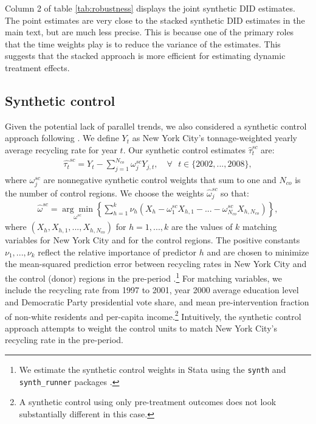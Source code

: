 \documentclass[12pt]{article}
\begin{document}
Column 2 of table \ref{tab:robustness} displays the joint synthetic DID estimates.  The point estimates are very close to the stacked synthetic DID estimates in the main text, but are much less precise.  This is because one of the primary roles that the time weights play is to reduce the variance of the estimates.  This suggests that the stacked approach is more efficient for estimating dynamic treatment effects.

\subsection{Synthetic control}

Given the potential lack of parallel trends, we also considered a synthetic control approach following \cite{abadie2021}.  We define \(Y_t\) as New York City's tonnage-weighted yearly average recycling rate for year \(t\).  Our synthetic control estimates \(\hat{\tau}_t^{sc}\) are:
\begin{align} \label{eq:sc}
    \hat{\tau_t}^{sc} = Y_t - \sum_{j=1}^{N_{co}} \omega^{sc}_j Y_{j,t}, \quad \forall \text{ } t \in \lbrace 2002,...,2008 \rbrace,
\end{align}
where \(\omega^{sc}_j\) are nonnegative synthetic control weights that sum to one and \(N_{co}\) is the number of control regions.  We choose the weights \(\hat{\omega}^{sc}_j\) so that:
\begin{align}
    \hat{\omega}^{sc} = \underset{\omega^{sc}}{\arg\min} \left\lbrace \sum_{h=1}^{k} \nu_h (X_h-\omega^{sc}_1 X_{h,1}-...-\omega^{sc}_{N_{co}} X_{h,N_{co}}) \right\rbrace,
\end{align}
where \((X_h,X_{h,1},...,X_{h,N_{co}})\) for \(h=1,...,k\) are the values of \(k\) matching variables for New York City and for the control regions.  The positive constants \(\nu_1,...,\nu_k\) reflect the relative importance of predictor \(h\) and are chosen to minimize the mean-squared prediction error between recycling rates in New York City and the control (donor) regions in the pre-period \citep{abadie2010}.\footnote{We estimate the synthetic control weights in Stata using the \verb+synth+ and \verb+synth_runner+ packages \citep{galianiquistorff2017}.}  For matching variables, we include the recycling rate from 1997 to 2001, year 2000 average education level and Democratic Party presidential vote share, and mean pre-intervention fraction of non-white residents and per-capita income.\footnote{A synthetic control using only pre-treatment outcomes does not look substantially different in this case.}  Intuitively, the synthetic control approach attempts to weight the control units to match New York City's recycling rate in the pre-period.
\end{document}
